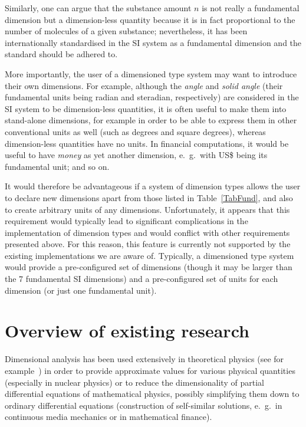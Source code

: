 \documentclass[11pt,a4paper]{article}
\begin{document}
Similarly, one can argue that the substance amount $n$ is not really a
fundamental dimension but a dimension-less quantity because it is in fact
proportional to the number of molecules of a given substance; nevertheless, it
has been internationally standardised in the SI system as a fundamental
dimension and the standard should be adhered to.

More importantly, the user of a dimensioned type system may want to introduce
their own dimensions. For example, although the \textit{angle} and
\textit{solid angle} (their fundamental units being radian and steradian,
respectively) are considered in the SI system to be dimension-less quantities,
it is often useful to make them into stand-alone dimensions, for example in
order to be able to express them in other conventional units as well
(such as degrees and square degrees), whereas dimension-less quantities have no
units. In financial computations, it would be useful to have \textit{money} as
yet another dimension, e.~g.\ with US\$ being its fundamental unit; and so on.

It would therefore be advantageous if a system of dimension types allows the
user to declare new dimensions apart from those listed in Table~\ref{TabFund},
and also to create arbitrary units of any dimensions. Unfortunately, it appears
that this requirement would typically lead to significant complications in the
implementation of dimension types and would conflict with other requirements
presented above. For this reason, this feature is currently not supported by
the existing implementations we are aware of. Typically, a dimensioned type
system would provide a pre-configured set of dimensions (though it may be
larger than the 7 fundamental SI dimensions) and a pre-configured set of units
for each dimension (or just one fundamental unit).

\section{Overview of existing research}
\label{Overview}

Dimensional analysis has been used extensively in theoretical physics (see for
example~\cite{SedovDim,Ovsyan}) in order to provide approximate values for
various physical quantities (especially in nuclear physics) or to reduce
the dimensionality of partial differential equations of mathematical physics,
possibly simplifying them down to ordinary differential equations (construction
of self-similar solutions, e.~g.\ in continuous media mechanics or in
mathematical finance).
\end{document}
